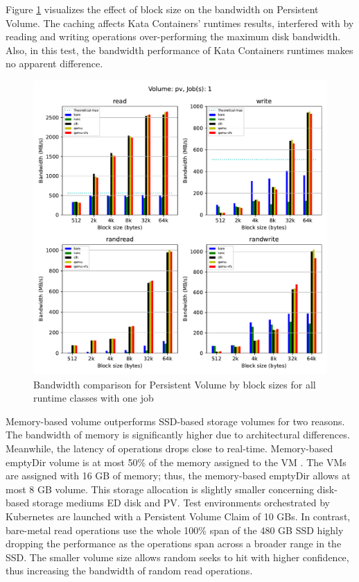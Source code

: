 Figure \ref{fig:ResultsPVByBS-1} visualizes the effect of block size on the bandwidth on Persistent Volume. The caching affects Kata Containers' runtimes results, interfered with by reading and writing operations over-performing the maximum disk bandwidth. Also, in this test, the bandwidth performance of Kata Containers runtimes makes no apparent difference.


\begin{figure}[ht]
  \begin{center}
    \includegraphics[width=12cm]{results/subplot_bw_by_bs_with_bare(pv,1).pdf}
    \caption{Bandwidth comparison for Persistent Volume by block sizes for all runtime classes with one job}
    \label{fig:ResultsPVByBS-1}
  \end{center}
\end{figure}

Memory-based volume outperforms SSD-based storage volumes for two reasons. The bandwidth of memory is significantly higher due to architectural differences. Meanwhile, the latency of operations drops close to real-time. Memory-based emptyDir volume is at most 50\% of the memory assigned to the VM \cite{VolumesKubernetes}. The VMs are assigned with 16 GB of memory; thus, the memory-based emptyDir allows at most 8 GB volume. This storage allocation is slightly smaller concerning disk-based storage mediums ED disk and PV. Test environments orchestrated by Kubernetes are launched with a Persistent Volume Claim of 10 GBs. In contrast, bare-metal read operations use the whole 100\% span of the 480 GB SSD \cite{IntelSSD} highly dropping the performance as the operations span across a broader range in the SSD. The smaller volume size allows random seeks to hit with higher confidence, thus increasing the bandwidth of random read operations.

